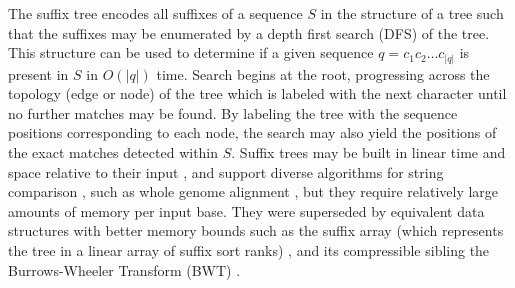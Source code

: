 The suffix tree \cite{weiner1973linear} encodes all suffixes of a sequence $S$ in the structure of a tree such that the suffixes may be enumerated by a depth first search (DFS) of the tree.
This structure can be used to determine if a given sequence $q = c_{1}c_{2}\ldots c_{|q|}$ is present in $S$ in $O(|q|)$ time.
Search begins at the root, progressing across the topology (edge or node) of the tree which is labeled with the next character until no further matches may be found.
By labeling the tree with the sequence positions corresponding to each node, the search may also yield the positions of the exact matches detected within $S$.
Suffix trees may be built in linear time and space relative to their input \cite{ukkonen1995line}, and support diverse algorithms for string comparison \cite{apostolico1985myriad}, such as whole genome alignment \cite{delcher1999alignment}, but they require relatively large amounts of memory per input base.
They were superseded by equivalent data structures with better memory bounds such as the suffix array (which represents the tree in a linear array of suffix sort ranks) \cite{manber1993suffix}, and its compressible sibling the Burrows-Wheeler Transform (BWT) \cite{burrows1994block}.

